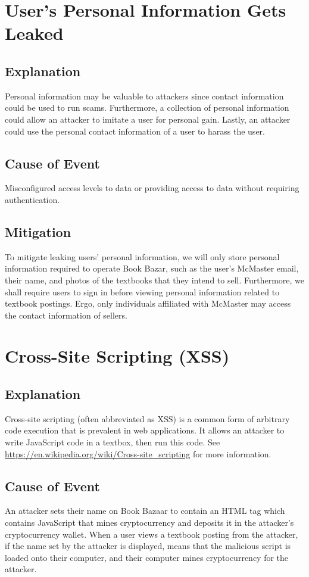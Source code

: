 \documentclass[fullpage]{article}
\begin{document}
\section{User's Personal Information Gets Leaked}

\subsection*{Explanation}
Personal information may be valuable to attackers since contact information could be used to run scams. Furthermore, a collection of personal information could allow an attacker to imitate a user for personal gain. Lastly, an attacker could use the personal contact information of a user to harass the user.
\subsection*{Cause of Event}
Misconfigured access levels to data or providing access to data without requiring authentication.
\subsection*{Mitigation}
To mitigate leaking users’ personal information, we will only store personal information required to operate Book Bazar, such as the user’s McMaster email, their name, and photos of the textbooks that they intend to sell. Furthermore, we shall require users to sign in before viewing personal information related to textbook postings. Ergo, only individuals affiliated with McMaster may access the contact information of sellers.

\section{Cross-Site Scripting (XSS)}

\subsection*{Explanation}
Cross-site scripting (often abbreviated as XSS) is a common form of arbitrary code execution that is prevalent in web applications. It allows an attacker to write JavaScript code in a textbox, then run this code. See \url{https://en.wikipedia.org/wiki/Cross-site_scripting}  for more information.

\subsection*{Cause of Event}
An attacker sets their name on Book Bazaar to contain an HTML tag which contains JavaScript that mines cryptocurrency and deposits it in the attacker’s cryptocurrency wallet. When a user views a textbook posting from the attacker, if the name set by the attacker is displayed, means that the malicious script is loaded onto their computer, and their computer mines cryptocurrency for the attacker.
\end{document}
